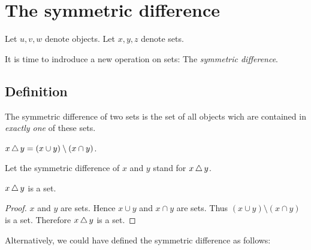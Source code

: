\documentclass[../../set-theory.ftl.tex]{subfiles}
\begin{document}
  \section{The symmetric difference}

  \begin{forthel}
  \end{forthel}

  \begin{forthel}
    Let $u,v,w$ denote objects.
    Let $x,y,z$ denote sets.
  \end{forthel}

  \noindent It is time to indroduce a new operation on sets: The
  \textit{symmetric difference}.


  \subsection{Definition}

  \noindent The symmetric difference of two sets is the set of all objects wich
  are contained in \textit{exactly one} of these sets.

  \begin{forthel}
    \begin{definition}
      $x \mathop{\triangle} y = (x \cup y) \setminus (x \cap y)$.
    \end{definition}

    Let the symmetric difference of $x$ and $y$ stand for $x \mathop{\triangle} y$.

    \begin{lemma}
      $x \mathop{\triangle} y$ is a set.
    \end{lemma}
    \begin{proof}
      $x$ and $y$ are sets.
      Hence $x \cup y$ and $x \cap y$ are sets.
      Thus $(x \cup y) \setminus (x \cap y)$ is a set.
      Therefore $x \mathop{\triangle} y$ is a set.
    \end{proof}
  \end{forthel}

  \noindent Alternatively, we could have defined the symmetric difference as
  follows:
\end{document}
